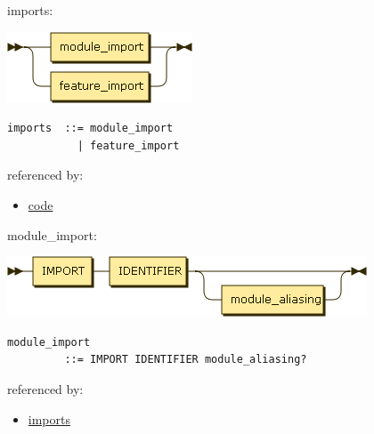 \begin{minipage}{\textwidth}
\protect\hypertarget{imports}{}{imports:}

\includegraphics[width=2.16667in,height=0.83333in]{diagram/imports.png}

\begin{verbatim}
imports  ::= module_import
           | feature_import
\end{verbatim}

referenced by:

\begin{itemize}
\tightlist
\item
  \protect\hyperlink{code}{code}
\end{itemize}

\end{minipage}

\begin{minipage}{\textwidth}
\protect\hypertarget{module_import}{}{module\_import:}

\includegraphics[width=4.20833in,height=0.70833in]{diagram/module_import.png}

\begin{verbatim}
module_import
         ::= IMPORT IDENTIFIER module_aliasing?
\end{verbatim}

referenced by:

\begin{itemize}
\tightlist
\item
  \protect\hyperlink{imports}{imports}
\end{itemize}

\end{minipage}

